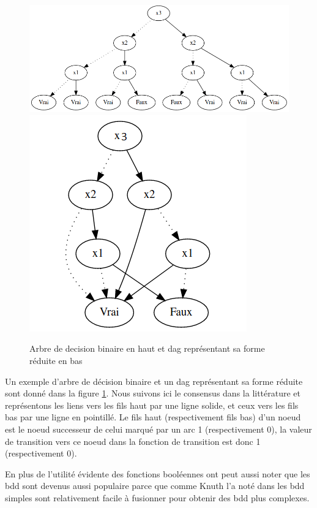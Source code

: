 \documentclass[french]{article}
\begin{document}
\begin{figure}[h!]
    \centering
    \includegraphics[scale=0.4]{bdd ex1.png}
    \includegraphics[scale=0.4]{robdd ex1.png}
    \caption{Arbre de decision binaire en haut et dag représentant sa forme réduite en bas}
    \label{fig:ROBDD1}
\end{figure}
\vspace{5mm} 

Un exemple d'arbre de décision binaire et un dag représentant sa forme réduite sont donné dans la figure \ref{fig:ROBDD1}. Nous suivons ici le consensus dans la littérature et représentons les liens vers les fils haut par une ligne solide, et ceux vers les fils bas par une ligne en pointillé. Le fils haut (respectivement fils bas) d'un noeud est le noeud successeur de celui marqué par un arc 1 (respectivement 0), la valeur de transition vers ce noeud dans la fonction de transition est donc 1 (respectivement 0).\medskip

En plus de l'utilité évidente des fonctions booléennes ont peut aussi noter que les bdd sont devenus aussi populaire parce que comme Knuth l'a noté dans \cite{knuth} les bdd simples sont relativement facile à fusionner pour obtenir des bdd plus complexes.\medskip
\end{document}

